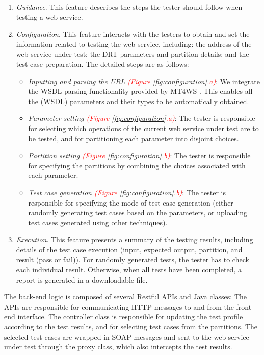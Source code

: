 \documentclass[10pt,journal,compsoc]{IEEEtran}
\begin{document}
\begin{enumerate}[1)]
  \item
  \emph{Guidance}. This feature describes the steps the tester should follow when testing a web service.

  \item
  \emph{Configuration}. This feature interacts with the testers to obtain and set the information related to testing the web service, including: the address of the web service under test; the DRT parameters and partition details; and the test case preparation. The detailed steps are as follows:

  \begin{itemize}
    \item
    \emph{Inputting and parsing the URL \textcolor{red}{(Figure \ref{fig:configuration}.a)}}: We integrate the WSDL parsing functionality provided by MT4WS \cite{sun2016mt4ws}. This enables all the (WSDL) parameters and their types to be automatically obtained.
    \item
    \emph{Parameter setting \textcolor{red}{(Figure \ref{fig:configuration}.a)}}: The tester is responsible for selecting which operations of the current web service under test are to be tested, and for partitioning each parameter into disjoint choices.
    \item
    \emph{Partition setting \textcolor{red}{(Figure \ref{fig:configuration}.b)}}: The tester is responsible for specifying the partitions by combining the choices associated with each parameter.
    \item
    \emph{Test case generation \textcolor{red}{(Figure \ref{fig:configuration}.b)}}: The tester is responsible for specifying the mode of test case generation (either randomly generating test cases based on the parameters, or uploading test cases generated using other techniques).
  \end{itemize}
  \item
  \emph{Execution}. This feature presents a summary of the testing results, including details of the test case execution (input, expected output, partition, and result (pass or fail)). For randomly generated tests, the tester has to check each individual result. Otherwise, when all tests have been completed, a report is generated in a downloadable file.
\end{enumerate}

The back-end logic is composed of several Restful APIs and Java classes: The APIs are responsible for communicating HTTP messages to and from the front-end interface. The controller class is responsible for updating the test profile according to the test results, and for selecting test cases from the partitions. The selected test cases are wrapped in SOAP messages and sent to the web service under test through the proxy class, which also intercepts the test results.
\end{document}
